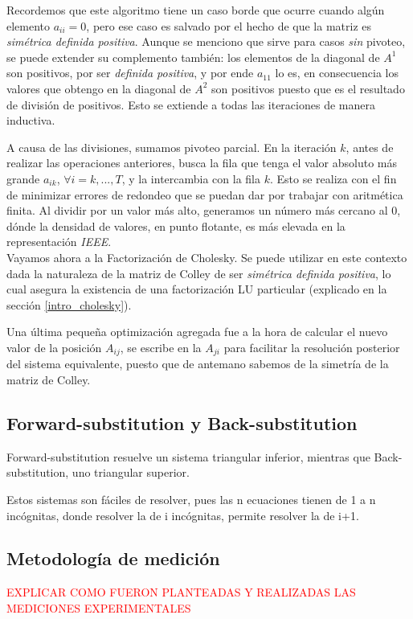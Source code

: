 Recordemos que este algoritmo tiene un caso borde que ocurre cuando alg\'un elemento $a_{ii} = 0$, pero ese caso es salvado por el hecho de que la matriz es \textit{sim\'etrica definida positiva}. Aunque se menciono que sirve para casos \textit{sin} pivoteo, se puede extender su complemento tambi\'en: los elementos de la diagonal de $A^{1}$ son positivos, por ser \textit{definida positiva}, y por ende $a_{11}$ lo es, en consecuencia los valores que obtengo en la diagonal de $A^{2}$ son positivos puesto que es el resultado de divisi\'on de positivos. Esto se extiende a todas las iteraciones de manera inductiva.

A causa de las divisiones, sumamos pivoteo parcial. En la iteraci\'on $k$, antes de realizar las operaciones anteriores, busca la fila que tenga el valor absoluto m\'as grande $a_{ik}$, $\forall i = k, ..., T$, y la intercambia con la fila $k$. Esto se realiza con el fin de minimizar errores de redondeo que se puedan dar por trabajar con aritm\'etica finita. Al dividir por un valor más alto, generamos un número más cercano al $0$, d\'onde la densidad de valores, en punto flotante, es m\'as elevada en la representaci\'on \textit{IEEE}. \\

Vayamos ahora a la Factorizaci\'on de Cholesky. Se puede utilizar en este contexto dada la naturaleza de la matriz de Colley de ser \textit{sim\'etrica definida positiva}, lo cual asegura la existencia de una factorizaci\'on LU particular (explicado en la secci\'on \ref{intro_cholesky}).

Una \'ultima pequeña optimizaci\'on agregada fue a la hora de calcular el nuevo valor de la posici\'on $A_{ij}$, se escribe en la $A_{ji}$ para facilitar la resoluci\'on posterior del sistema equivalente, puesto que de antemano sabemos de la simetr\'ia de la matriz de Colley.

\subsection{Forward-substitution y Back-substitution}
Forward-substitution resuelve un sistema triangular inferior, mientras que Back-substitution, uno triangular superior.

Estos sistemas son f\'aciles de resolver, pues las n ecuaciones tienen de 1 a n inc\'ognitas, donde resolver la de i inc\'ognitas, permite resolver la de i+1.

\subsection{Metodolog\'ia de medici\'on}

\textcolor{red}{EXPLICAR COMO FUERON PLANTEADAS Y REALIZADAS LAS MEDICIONES EXPERIMENTALES}